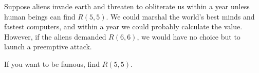 \documentclass[./some_latex_template.tex]{subfiles}
\begin{document}
\begin{displayquote}
Suppose aliens invade earth and threaten to obliterate us within a year unless human beings can find $R(5, 5)$. We could marshal the world's best minds and fastest computers, and within a year we could probably calculate the value. However, if the aliens demanded $R(6, 6)$, we would have no choice but to launch a preemptive attack.
\end{displayquote}
If you want to be famous, find $R(5, 5)$. 


\end{document}
